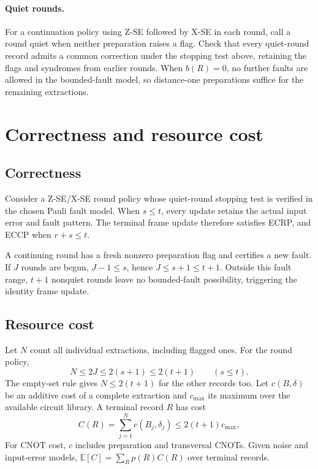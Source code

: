 \documentclass[11pt,a4paper]{article}
\theoremstyle{definition}
\begin{document}
\paragraph{Quiet rounds.}
For a continuation policy using Z-SE followed by X-SE in each round,
call a round quiet when neither preparation raises a flag. Check that
every quiet-round record admits a common correction under the stopping
test above, retaining the flags and syndromes from earlier rounds.
When $b(R)=0$, no further faults are allowed in the bounded-fault model,
so distance-one preparations suffice for the remaining extractions.

\section{Correctness and resource cost}
\label{sec:correctness-cost}

\subsection{Correctness}

Consider a Z-SE/X-SE round policy whose quiet-round stopping test is
verified in the chosen Pauli fault model. When $s\leq t$, every update
retains the actual input error
and fault pattern. The terminal frame update therefore satisfies ECRP,
and ECCP when $r+s\leq t$.

A continuing round has a fresh nonzero preparation flag and certifies a
new fault. If $J$ rounds are begun, $J-1\leq s$, hence $J\leq s+1\leq t+1$.
Outside this fault range, $t+1$ nonquiet rounds leave no bounded-fault
possibility, triggering the identity frame update.

\subsection{Resource cost}

Let $N$ count all individual extractions, including flagged ones. For
the round policy,
\begin{equation}
    N\leq 2J\leq 2(s+1)\leq 2(t+1)
    \qquad(s\leq t).
    \label{eq:extraction-cost}
\end{equation}
The empty-set rule gives $N\leq2(t+1)$ for the other records too.
Let $c(B,\delta)$ be an additive cost of a complete extraction and $c_{\max}$ its
maximum over the available circuit library. A terminal record $R$ has cost
\begin{equation}
    C(R)=\sum_{j=1}^{N}c(B_j,\delta_j)
    \leq 2(t+1)c_{\max},
    \label{eq:circuit-cost}
\end{equation}
For CNOT cost, $c$ includes preparation and transversal CNOTs. Given noise
and input-error models, $\mathbb E[C]=\sum_R p(R)C(R)$ over terminal records.
\end{document}
